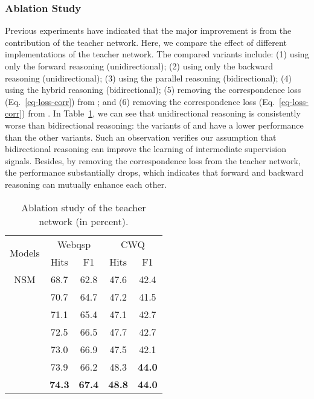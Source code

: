\subsubsection{Ablation Study}
Previous experiments have indicated that the major improvement is from the contribution of the teacher network. Here, we compare the effect of different implementations of the teacher network. 
The compared variants include: (1) \underline{} using only the forward reasoning (unidirectional); (2)  \underline{} using only the backward reasoning (unidirectional); (3) \underline{} using the parallel reasoning (bidirectional); (4) \underline{} using the hybrid reasoning (bidirectional); (5) \underline{} removing the correspondence loss (Eq.~\ref{eq-loss-corr}) from ; and (6) \underline{} removing the correspondence loss (Eq.~\ref{eq-loss-corr}) from .  
In Table~\ref{tab:ablation}, we can see that  unidirectional reasoning is consistently worse than bidirectional reasoning: the variants of  and  have a lower performance than the other variants. 
Such an observation verifies our assumption that bidirectional reasoning can improve the learning of intermediate supervision signals. 
Besides, by removing the correspondence loss from the teacher network, the performance substantially drops, which indicates that forward and backward reasoning can mutually  enhance each other. 

\begin{table}[htbp]
	\centering
	\caption{Ablation study of the teacher network (in percent).}
	\label{tab:ablation}\begin{tabular}{c c c | c c}
\hline
			\multirow{2}{*}{Models}&\multicolumn{2}{c}{Webqsp}&\multicolumn{2}{c}{CWQ}\\
			\cline{2-5}
			&Hits&F1&Hits&F1\\
			\hline
			NSM	&	68.7& 62.8&47.6&	42.4\\
			\hline
			&	70.7& 64.7& 47.2& 41.5\\
			&	71.1& 65.4& 47.1& 42.7\\
			&	72.5&	66.5& 47.7& 42.7\\
			&	73.0& 	66.9& 47.5& 42.1\\
			&	73.9& 66.2	&48.3&\textbf{44.0}\\
&	\textbf{74.3}& \textbf{67.4}& \textbf{48.8} & \textbf{44.0}\\
			\hline
		\end{tabular}\end{table}



